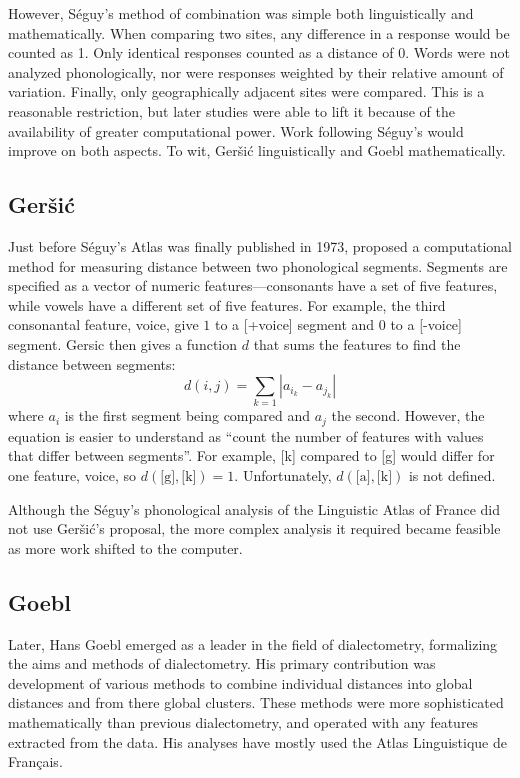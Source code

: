 \documentclass[11pt]{article}
\begin{document}
However, S\'eguy's method of combination was simple both
linguistically and mathematically. When comparing two sites, any
difference in a response would be counted as 1. Only identical
responses counted as a distance of 0. Words were not analyzed
phonologically, nor were responses weighted by their relative amount
of variation. Finally, only geographically adjacent sites were
compared. This is a reasonable restriction, but later studies were
able to lift it because of the availability of greater computational
power. Work following S\'eguy's would improve on both aspects. To wit,
Ger\v{s}i\'c linguistically and Goebl mathematically.

\subsection{Ger\v{s}i\'c}
Just before S\'eguy's Atlas was finally published in 1973,
 proposed a computational method for measuring
distance between two phonological segments. Segments are specified as
a vector of numeric features---consonants have a set of five features,
while vowels have a different set of five features.  For example, the
third consonantal feature, voice, give $1$ to a [+voice] segment and
$0$ to a [-voice] segment. Gersic then gives a function $d$ that sums
the features to find the distance between segments:
\[ d(i,j) = \sum_{k=1} |a_{i_k} - a_{j_k}|\] where $a_i$ is the first
segment being compared and $a_j$ the second. However, the equation is
easier to understand as ``count the
number of features with values that differ between segments''. For
example, [k] compared to [g] would differ for one feature, voice, so
$d(\textrm{[g]},\textrm{[k]}) = 1$. Unfortunately, $d(\textrm{[a]},
\textrm{[k]})$ is not defined.

Although the S\'eguy's phonological analysis of the Linguistic Atlas
of France did not use Ger\v{s}i\'c's proposal, the more complex
analysis it required became feasible as more work shifted to the computer.

\subsection{Goebl}

Later, Hans Goebl emerged as a leader in the field of dialectometry,
formalizing the aims and methods of dialectometry. His primary
contribution was development of various methods to combine individual
distances into global distances and from there global clusters. These
methods were more sophisticated mathematically than previous
dialectometry, and operated with any features extracted from the data. His
analyses have mostly used the Atlas Linguistique de Fran\c{c}ais.
\end{document}
